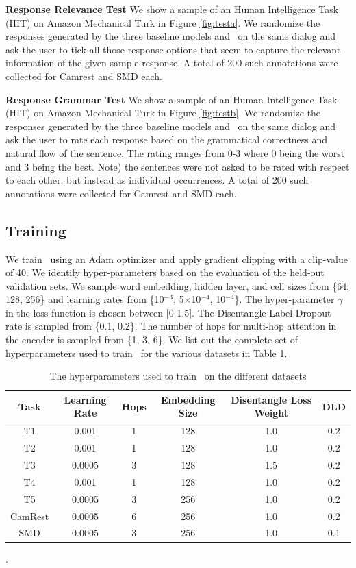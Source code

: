 \noindent \textbf{Response Relevance Test} 
We show a sample of an Human Intelligence Task (HIT) on Amazon Mechanical Turk in Figure \ref{fig:testa}. We randomize the responses generated by the three baseline models and \sys\ on the same dialog and ask the user to tick all those response options that seem to capture the relevant information of the given sample response. A total of 200 such annotations were collected for Camrest and SMD each.

\noindent \textbf{Response Grammar Test}
We show a sample of an Human Intelligence Task (HIT) on Amazon Mechanical Turk in Figure \ref{fig:testb}. We randomize the responses generated by the three baseline models and \sys\ on the same dialog and ask the user to rate each response based on the grammatical correctness and natural flow of the sentence. The rating ranges from 0-3 where 0 being the worst and 3 being the best. Note) the sentences were not asked to be rated with respect to each other, but instead as individual occurrences. A total of 200 such annotations were collected for Camrest and SMD each.

\subsection{Training}
We train \sys\ using an Adam optimizer \cite{kingma2014adam} and apply gradient clipping with a clip-value of 40. We identify hyper-parameters based on the evaluation of the held-out validation sets. We sample word embedding, hidden layer, and cell sizes from \{64, 128, 256\} and learning rates from \{10$^{-3}$, 5$\times$10$^{-4}$, 10$^{-4}$\}. The hyper-parameter $\gamma$ in the loss function is chosen between [0-1.5]. The Disentangle Label Dropout rate is sampled from \{0.1, 0.2\}. The number of hops for multi-hop attention in the encoder is sampled from \{1, 3, 6\}. 
We list out the complete set of hyperparameters used to train \sys\ for the various datasets in Table \ref{tab:params}. 

\vspace*{0.5in}

\begin{table}[ht]
\centering
\footnotesize
\begin{tabular}{c|ccccc}
\toprule
\textbf{Task} & \textbf{Learning Rate} & \textbf{Hops} &  \textbf{Embedding Size} & \textbf{Disentangle Loss Weight} & \textbf{DLD}\\
\midrule
T1 & 0.001 & 1 & 128 & 1.0 & 0.2 \\
T2 & 0.001 & 1 & 128 & 1.0 & 0.2 \\
T3 & 0.0005 & 3 & 128 & 1.5 & 0.2 \\
T4 & 0.001 & 1 & 128 & 1.0 & 0.2 \\
T5 & 0.0005 & 3 & 256 & 1.0 & 0.2 \\
CamRest & 0.0005 & 6 & 256 & 1.0 & 0.2 \\
SMD & 0.0005 & 3 & 256 & 1.0 & 0.1 \\
\bottomrule 
\end{tabular}
\caption{The hyperparameters used to train \sys\ on the different datasets}. 
\label{tab:params}
\end{table}



